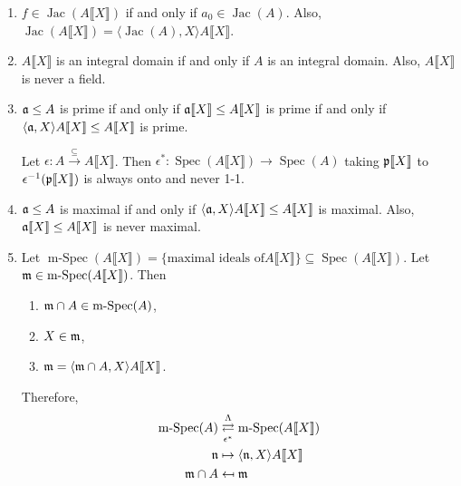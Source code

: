 \begin{proposition}
\begin{enumerate}
        \item $f \in \operatorname{Jac}(A\llbracket X \rrbracket)$ if and only if $a_0 \in \operatorname{Jac}(A)$. Also, $\operatorname{Jac}(A\llbracket X \rrbracket) = \langle \operatorname{Jac}(A),X \rangle A\llbracket X \rrbracket$. 
        \item $A\llbracket X \rrbracket$ is an integral domain if and only if $A$ is an integral domain. Also, $A\llbracket X \rrbracket$ is never a field.
        \item $\mathfrak{a} \leq A$ is prime if and only if $\mathfrak{a} \llbracket X \rrbracket \leq A\llbracket X \rrbracket$ is prime if and only if $\langle \mathfrak{a},X \rangle A \llbracket X \rrbracket \leq A\llbracket X \rrbracket$ is prime. \par 
            Let $\epsilon: A \xrightarrow {\subseteq} A\llbracket X \rrbracket$. Then $\epsilon^*: \operatorname{Spec}(A\llbracket X \rrbracket) \to \operatorname{Spec}(A)$ taking $\mathfrak{p} \llbracket X \rrbracket$ to $\epsilon^{-1}(\mathfrak{p}\llbracket X \rrbracket)$ is always onto and never 1-1.
        \item $\mathfrak{a} \leq A$ is maximal if and only if $\langle \mathfrak{a},X \rangle A \llbracket X \rrbracket \leq A \llbracket X \rrbracket$ is maximal. Also, $\mathfrak{a} \llbracket X \rrbracket \leq A\llbracket X \rrbracket$ is never maximal.
        \item Let $\operatorname{m-Spec}(A\llbracket X \rrbracket) = \{\text{maximal ideals of}A\llbracket X \rrbracket\} \subseteq \operatorname{Spec}(A\llbracket X \rrbracket)$. Let $\mathfrak{m} \in \operatorname{m-Spec}(A\llbracket X \rrbracket)$. Then 
            \begin{enumerate}
                \item $\mathfrak{m} \cap A \in \operatorname{m-Spec}(A)$,
                \item $X \in \mathfrak{m}$,
                \item $\mathfrak{m} = \langle \mathfrak{m} \cap A,X \rangle A\llbracket X \rrbracket$.
            \end{enumerate}
            \par Therefore,
            \begin{align*}
                \operatorname{m-Spec}(A) &\mathrel{\mathop{\rightleftarrows}^{\mathrm{\Lambda}}_{\mathrm{\epsilon^*}}} \operatorname{m-Spec}(A\llbracket X \rrbracket)  \\
                \mathfrak{n} & \mapsto \langle \mathfrak{n},X \rangle A\llbracket X \rrbracket \\
                \mathfrak{m} \cap A &\mapsfrom \mathfrak{m}
            \end{align*}
    \end{enumerate}
\end{proposition}


